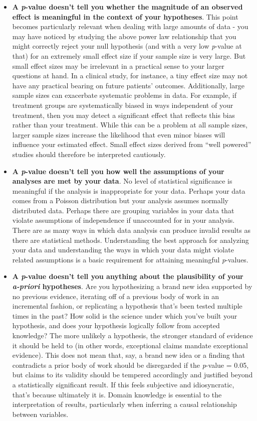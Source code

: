 \documentclass[]{book}
\begin{document}
\begin{itemize}
\item
  \textbf{A \emph{p}-value doesn't tell you whether the magnitude of an observed effect is meaningful in the context of your hypotheses}. This point becomes particularly relevant when dealing with large amounts of data - you may have noticed by studying the above power law relationship that you might correctly reject your null hypothesis (and with a very low \emph{p}-value at that) for an extremely small effect size if your sample size is very large. But small effect sizes may be irrelevant in a practical sense to your larger questions at hand. In a clinical study, for instance, a tiny effect size may not have any practical bearing on future patients' outcomes. Additionally, large sample sizes can exacerbate systematic problems in data. For example, if treatment groups are systematically biased in ways independent of your treatment, then you may detect a significant effect that reflects this bias rather than your treatment. While this can be a problem at all sample sizes, larger sample sizes increase the likelihood that even minor biases will influence your estimated effect. Small effect sizes derived from ``well powered'' studies should therefore be interpreted cautiously.
\item
  \textbf{A \emph{p}-value doesn't tell you how well the assumptions of your analyses are met by your data}. No level of statistical significance is meaningful if the analysis is inappropriate for your data. Perhaps your data comes from a Poisson distribution but your analysis assumes normally distributed data. Perhaps there are grouping variables in your data that violate assumptions of independence if unaccounted for in your analysis. There are as many ways in which data analysis can produce invalid results as there are statistical methods. Understanding the best approach for analyzing your data and understanding the ways in which your data might violate related assumptions is a basic requirement for attaining meaningful \emph{p}-values.
\item
  \textbf{A \emph{p}-value doesn't tell you anything about the plausibility of your \emph{a-priori} hypotheses}. Are you hypothesizing a brand new idea supported by no previous evidence, iterating off of a previous body of work in an incremental fashion, or replicating a hypothesis that's been tested multiple times in the past? How solid is the science under which you've built your hypothesis, and does your hypothesis logically follow from accepted knowledge? The more unlikely a hypothesis, the stronger standard of evidence it should be held to (in other words, exceptional claims mandate exceptional evidence). This does not mean that, say, a brand new idea or a finding that contradicts a prior body of work should be disregarded if the \emph{p}-value = 0.05, but claims to its validity should be tempered accordingly and justified beyond a statistically significant result. If this feels subjective and idiosyncratic, that's because ultimately it is. Domain knowledge is essential to the interpretation of results, particularly when inferring a causal relationship between variables.
\end{itemize}
\end{document}
